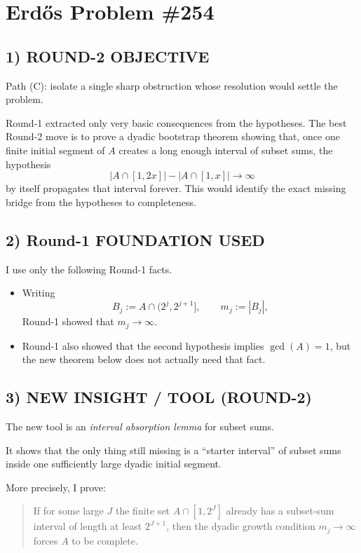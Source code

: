 \section{Erd\H{o}s Problem \#254}

\subsection*{1) ROUND-2 OBJECTIVE}
Path (C): isolate a single sharp obstruction whose resolution would settle the problem.

Round-1 extracted only very basic consequences from the hypotheses. The best Round-2 move is to prove a dyadic bootstrap theorem showing that, once one finite initial segment of $A$ creates a long enough interval of subset sums, the hypothesis
\[
|A\cap[1,2x]|-|A\cap[1,x]|\to\infty
\]
by itself propagates that interval forever. This would identify the exact missing bridge from the hypotheses to completeness.

\subsection*{2) Round-1 FOUNDATION USED}
I use only the following Round-1 facts.

\begin{itemize}
\item Writing
\[
B_j:=A\cap(2^j,2^{j+1}],
\qquad
m_j:=|B_j|,
\]
Round-1 showed that $m_j\to\infty$.
\item Round-1 also showed that the second hypothesis implies $\gcd(A)=1$, but the new theorem below does not actually need that fact.
\end{itemize}

\subsection*{3) NEW INSIGHT / TOOL (ROUND-2)}
The new tool is an \emph{interval absorption lemma} for subset sums.

It shows that the only thing still missing is a ``starter interval'' of subset sums inside one sufficiently large dyadic initial segment.

More precisely, I prove:

\begin{quote}
If for some large $J$ the finite set $A\cap[1,2^J]$ already has a subset-sum interval of length at least $2^{J+1}$, then the dyadic growth condition $m_j\to\infty$ forces $A$ to be complete.
\end{quote}

